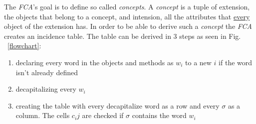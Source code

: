 The \emph{FCA}'s goal is to define so called \emph{concepts}. A \emph{concept} is a tuple of extension, the objects that belong to a concept, and intension, all the attributes that \underline{every} object of the extension has.
In order to be able to derive such a \emph{concept} the \emph{FCA} creates an incidence table. The table can be derived in 3 steps as seen in Fig. ~\ref{flowchart}:
\begin{enumerate}
  \item declaring every word in the objects and methods as $w_i$ to a new $i$ if the word isn't already defined
  \item decapitalizing every $w_i$
  \item creating the table with every decapitalize word as a row and every $\sigma$ as a column. The cells $c_ij$ are checked if  $\sigma$ contains the word $w_i$
\end{enumerate}
\pagebreak
